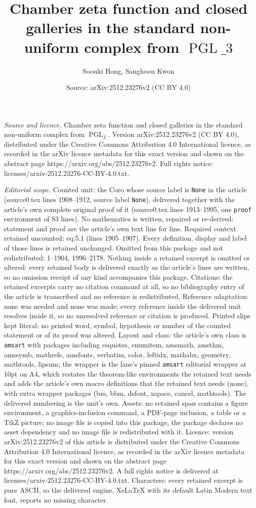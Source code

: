 \documentclass[10pt,a4paper]{amsart}
\title[Chamber zeta function and closed galleries in the standard n]{Chamber zeta function and closed galleries in the standard non-uniform complex from $\operatorname{PGL}\_3$}
\author{Soonki Hong, Sanghoon Kwon}
\date{Source: arXiv:2512.23276v2 (CC BY 4.0)}
\begin{document}
\maketitle

\noindent\emph{Source and licence.} Chamber zeta function and closed galleries in the standard non-uniform complex from $\operatorname{PGL}_3$. Version arXiv:2512.23276v2 (CC BY 4.0), distributed under the Creative Commons Attribution 4.0 International licence, as recorded in the arXiv licence metadata for this exact version and shown on the abstract page https://arxiv.org/abs/2512.23276v2. Full rights notice: licenses/arxiv-2512.23276-CC-BY-4.0.txt.\par\smallskip

\noindent\textit{Editorial scope.} Counted unit: the Coro whose source label is \texttt{None} in the article (source0.tex lines 1908--1912, source label \texttt{None}), delivered together with the article's own complete original proof of it (source0.tex lines 1913--1995, one \texttt{proof} environment of 83 lines). No mathematics is written, repaired or re-derived: statement and proof are the article's own text line for line. Required context retained uncounted: eq:5.1 (lines 1905--1907). Every definition, display and label of those lines is retained unchanged. Omitted from this package and not redistributed: 1--1904, 1996--2178. Nothing inside a retained excerpt is omitted or altered: every retained body is delivered exactly as the article's lines are written, so no omission receipt of any kind accompanies this package. Citations: the retained excerpts carry no citation command at all, so no bibliography entry of the article is transcribed and no reference is redistributed. Reference adaptation: none was needed and none was made; every reference inside the delivered unit resolves inside it, so no unresolved reference or citation is produced. Printed slips kept literal: no printed word, symbol, hypothesis or number of the counted statement or of its proof was altered. Layout and class: the article's own class is \texttt{amsart} with packages including csquotes, enumitem, amsmath, amsthm, amssymb, mathrsfs, amsfonts, verbatim, color, leftidx, mathabx, geometry, mathtools, lipsum; the wrapper is the lane's pinned \texttt{amsart} editorial wrapper at 10pt on A4, which restates the theorem-like environments the retained text needs and adds the article's own macro definitions that the retained text needs (none), with extra wrapper packages (bm, bbm, dsfont, xspace, cancel, mathtools). The delivered numbering is the unit's own. Assets: no retained span contains a figure environment, a graphics-inclusion command, a PDF-page inclusion, a table or a TikZ picture; no image file is copied into this package, the package declares no asset dependency and no image file is redistributed with it. Licence: version arXiv:2512.23276v2 of this article is distributed under the Creative Commons Attribution 4.0 International licence, as recorded in the arXiv licence metadata for this exact version and shown on the abstract page https://arxiv.org/abs/2512.23276v2. A full rights notice is delivered at licenses/arxiv-2512.23276-CC-BY-4.0.txt. Characters: every retained excerpt is pure ASCII, so the delivered engine, XeLaTeX with its default Latin Modern text font, reports no missing character.
\end{document}
